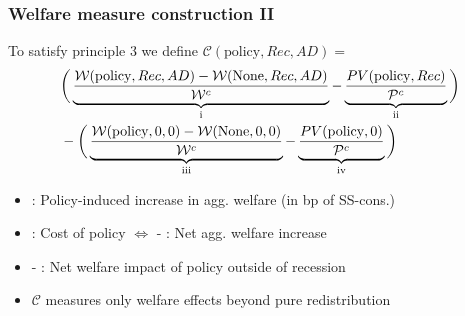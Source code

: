 \documentclass[pdflatex,aspectratio=169]{beamer}
\newcommand{\RNum}[1]{\uppercase\expandafter{\romannumeral #1\relax}}
\begin{document}
\begin{frame}
	\frametitle{Welfare measure construction II}
	\hypertarget{WelfareMeasure2}{}
	
	To satisfy principle 3 we define $\mathcal{C}(\text{policy},Rec,AD) =$
	\begin{align*}
		& \bigg( \underbrace{\frac{\mathcal{W}(\text{policy},Rec,AD)-\mathcal{W}(\text{None},Rec,AD)}{\mathcal{W}^c}}_\text{\RNum{1}}  - \underbrace{\frac{PV(\text{policy},Rec)}{\mathcal{P}^c} }_\text{\RNum{2}} \bigg) \nonumber \\  
		& -
		\bigg( \underbrace{\frac{\mathcal{W}(\text{policy},0,0) - \mathcal{W}(\text{None},0,0)}{\mathcal{W}^c}}_\text{\RNum{3}}  - \underbrace{\frac{PV(\text{policy},0)}{\mathcal{P}^c}}_\text{\RNum{4}}  \bigg) 
	\end{align*}
	
	\begin{itemize}
		\item \RNum{1}: Policy-induced increase in agg. welfare (in bp of SS-cons.)
		\item \RNum{2}: Cost of policy $\Leftrightarrow$ \RNum{1} - \RNum{2}: Net agg. welfare increase
		\item \RNum{3} - \RNum{4}: Net welfare impact of policy outside of recession
		\item $\mathcal{C}$ measures only welfare effects beyond pure redistribution
	\end{itemize}

	\vspace{1cm}
	\hyperlink{WelfareMeasure}{}
	
\end{frame}
\end{document}
